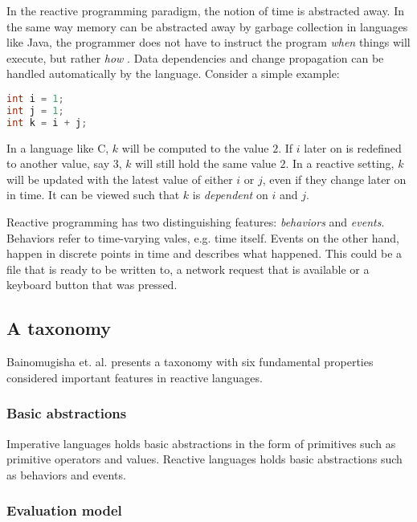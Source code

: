 In the reactive programming paradigm, the notion of time is abstracted away. In
the same way memory can be abstracted away by garbage collection in languages
like Java, the programmer does not have to instruct the program \textit{when}
things will execute, but rather \textit{how} \cite{bainomugisha2013survey}.
Data dependencies and change propagation can be handled automatically by the
language. Consider a simple example:

\begin{lstlisting}[language=C]
int i = 1;
int j = 1;
int k = i + j;
\end{lstlisting}

In a language like C, $k$ will be computed to the value $2$. If $i$ later on is
redefined to another value, say $3$, $k$ will still hold the same value $2$. In
a reactive setting, $k$ will be updated with the latest value of either $i$ or
$j$, even if they change later on in time. It can be viewed such that $k$ is
\textit{dependent} on $i$ and $j$. \cite{bainomugisha2013survey}

Reactive programming has two distinguishing features: \textit{behaviors} and
\textit{events}. Behaviors refer to time-varying vales, e.g. time itself.
Events on the other hand, happen in discrete points in time and describes what
happened. This could be a file that is ready to be written to, a network
request that is available or a keyboard button that was pressed.
\cite{bainomugisha2013survey}

\subsection{A taxonomy}

Bainomugisha et. al. \cite{bainomugisha2013survey} presents a taxonomy with six
fundamental properties considered important features in reactive languages.

\subsubsection{Basic abstractions}

Imperative languages holds basic abstractions in the form of primitives such as
primitive operators and values. Reactive languages holds basic abstractions
such as behaviors and events.

\subsubsection{Evaluation model}

